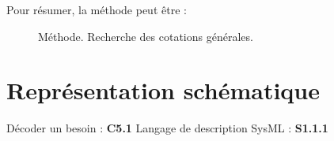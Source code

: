 \documentclass[
	11pt, %
	fleqn, %
	a4paper, %
]{LegrandOrangeBook}
\begin{document}
Pour résumer, la méthode peut être :\\
\begin{figure}[H] %
	\centering %
	\caption{Méthode. Recherche des cotations générales.}
	\label{Tol2} %
\end{figure}










\chapterspaceabove{6.25cm} %
\chapterspacebelow{7.5cm} %

\chapter{Représentation schématique}

\begin{corollary}[S1]
Décoder un besoin : \textbf{C5.1} 
Langage de description SysML : \textbf{S1.1.1}
\end{corollary}
\end{document}
